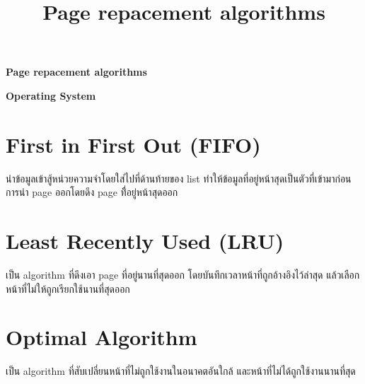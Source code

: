 \documentclass[12pt]{article}
\title{Page repacement algorithms}
\begin{document}
\begin{center}
 \Huge
\textbf{Page repacement algorithms}

\textbf{Operating System}
  
\end{center}

\newpage
\section{First in First Out (FIFO)}
นำข้อมูลเข้าสู้หน่วยความจำโดยใส่ไปที่ด้านท้ายของ list ทำให้ข้อมูลที่อยู่หน้าสุดเป็นตัวที่เข้ามาก่อน การนำ page ออกโดยดึง page ที่ิอยู่หน้าสุดออก

\section{Least Recently Used (LRU)}
เป็น algorithm ที่ดึงเอา page ที่อยู่นานที่สุดออก โดยบันทึกเวลาหน้าที่ถูกอ้างอิงไว้ล่าสุด แล้วเลือกหน้าที่ไม่ให้ถูกเรียกใช้นานที่สุดออก  

\section{Optimal Algorithm}
เป็น algorithm ที่สับเปลี่ยนหน้าที่ไม่ถูกใช้งานในอนาคตอันใกล้ และหน้าที่ไม่ได้ถูกใช้งานนานที่สุด
\end{document}
